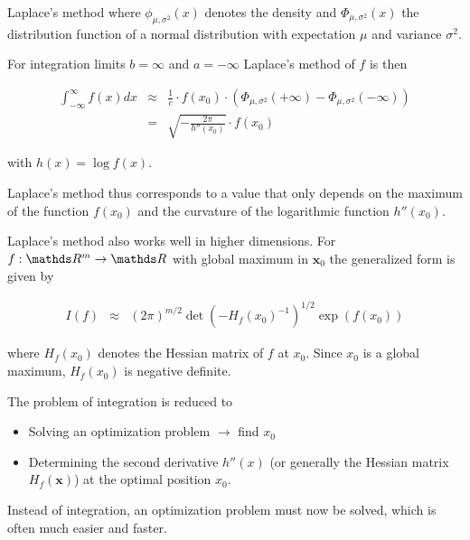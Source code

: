 \documentclass[11pt,compress,t,notes=noshow, xcolor=table]{beamer}
\begin{document}
\begin{vbframe}{Laplace's method}
where $\phi_{\mu, \sigma^2}(x)$ denotes the density and $\Phi_{\mu, \sigma^2}(x)$ the distribution function of a normal distribution with expectation $\mu$ and variance $\sigma^2$.

\framebreak

For integration limits $b = \infty$ and $a = -\infty$ Laplace's method of $f$ is then

\begin{eqnarray*}
\int_{-\infty}^{\infty} f(x) dx &\approx& \frac{1}{c}\cdot f(x_0) \cdot \left(\Phi_{\mu, \sigma^2}(+ \infty) - \Phi_{\mu, \sigma^2}(-\infty)\right) \\
&=& \sqrt{- \frac{2\pi}{h''(x_0)}} \cdot f(x_0)
\end{eqnarray*}

with $h(x) = \log f(x)$.

\lz

Laplace's method thus corresponds to a value that only depends on the maximum of the function $f(x_0)$ and the curvature of the logarithmic function $h''(x_0)$.
\framebreak

Laplace's method also works well in higher dimensions. For $f:\R^{m} \to \R$ with global maximum in $\bm{x}_0$ the generalized form is given by

\begin{eqnarray*}
I(f) &\approx& (2\pi)^{m/2} \det(-H_f(x_0)^{-1})^{1/2} \exp(f(x_0))
\end{eqnarray*}

where $H_f(x_0)$ denotes the Hessian matrix of $f$ at $x_0$. Since $x_0$ is a global maximum, $H_f(x_0)$ is negative definite.

\lz

The problem of integration is reduced to

\begin{itemize}
\item Solving an optimization problem $\to$ find $x_0$
\item Determining the second derivative $h''(x)$ (or generally the Hessian matrix $H_f(\bm{x})$) at the optimal position $x_0$.
\end{itemize}

Instead of integration, an optimization problem must now be solved, which is often much easier and faster.



\end{vbframe}
\end{document}
